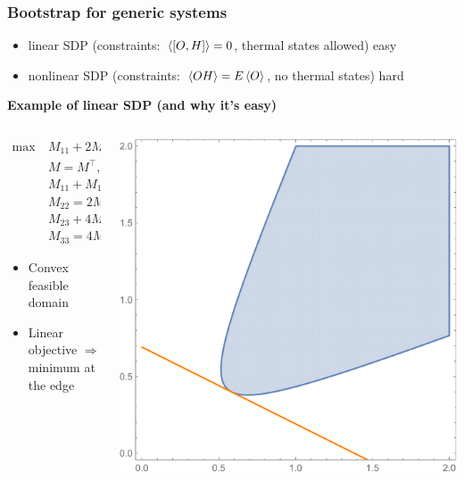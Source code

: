 \documentclass{beamer}
\begin{document}
\begin{frame}
\frametitle{Bootstrap for generic systems}

\begin{itemize}
    \item linear SDP (constraints: $\expval*{\comm{O}{H}} = 0$, thermal states allowed) easy
    \item nonlinear SDP (constraints: $\expval*{{O}{H}} = E \expval{O}$, no thermal states) hard 
\end{itemize}

\textbf{Example of linear SDP (and why it's easy)} 

\begin{columns}
    \begin{column}{0.5\textwidth}
        \[
            \begin{aligned}
                \max\  &M_{11} + 2 M_{12}, \ \text{s.t.} \\
                &M = M^\top, \ M \geq 0, \\
                &M_{11} + M_{12} + M_{13} = - 0.5, \\
                &M_{22} = 2 M_{11} + 3 M_{12} + 1, \\
                &M_{23} + 4 M_{11} = 0, \\
                &M_{33} = 4 M_{11} + 5M_{12}.
            \end{aligned}
        \]
        \begin{itemize}
            \item Convex feasible domain
            \item Linear objective $\Rightarrow$ minimum at the edge
        \end{itemize}
    \end{column}
    \begin{column}{0.5\textwidth}
        \includegraphics[width=\textwidth]{jump-toy-2-benchmark-feasible-domain-and-result.pdf}
    \end{column}
\end{columns}


\end{frame}
\end{document}
